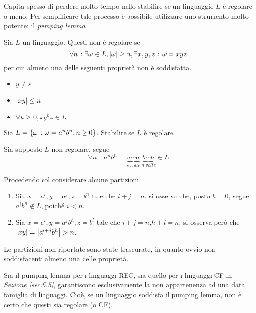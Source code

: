 \documentclass{subfiles}
\begin{document}
Capita spesso di perdere molto tempo nello stabilire se un linguaggio \(L\) è regolare o meno.
Per semplificare tale processo è possibile utilizzare uno strumento molto potente: il \emph{pumping lemma}.

\begin{Lemma}
    Sia \(L\) un linguaggio. Questi non è regolare se
    \[
        \forall n \operatorname{\: {:} \:} \exists \omega \in L, \abs{\omega} \ge n, \exists x,y,z \operatorname{\: {:} \:} \omega = xyz
    \]
    per cui almeno una delle seguenti proprietà non è soddisfatta.
    \begin{multicols}{3}
        \begin{itemize}
            \item \(y \neq \varepsilon\)
            \item \(\abs{xy} \le n\)
            \item \(\forall k \ge 0, xy^{k}z \in L\)
        \end{itemize}
    \end{multicols}
\end{Lemma}

\begin{Exercise*}
    Sia \(L = \left\{\omega \operatorname{\: {:} \:} \omega = a^{n}b^{n}, n \ge 0\right\}\). Stabilire se \(L\) è regolare.
    \begin{Solution*}
        Sia supposto \(L\) non regolare, segue
        \[
            \forall n \quad a^{n}b^{n} = \underbrace{a \cdots a}_{n \ volte} \underbrace{b \cdots b}_{\ n \ volte} \in L
        \]

        \noindent Procedendo col considerare alcune partizioni
        \begin{enumerate}
            \item Sia \(x = a^{i}, y = a^{j}, z = b^{n}\) tale che \(i + j = n\):
                  si osserva che, posto \(k = 0\), segue \(a^{i}b^{n} \notin L\), poiché \(i < n\).

            \item Sia \(x = a^{i}, y = a^{j}b^{h}, z = b^{l}\) tale che \(i + j = n \text{,} h + l = n\):
                  si osserva però che \(\abs{xy} = \abs{a^{i + j}b^{h}} > n\).
        \end{enumerate}

        \begin{Note*}
            Le partizioni non riportate sono state trascurate, in quanto ovvio non soddisfacenti almeno una delle proprietà.
        \end{Note*}
    \end{Solution*}
\end{Exercise*}
\begin{Remark*}
    Sia il pumping lemma per i linguaggi REC, sia quello per i linguaggi CF in \emph{Sezione \eqref{sec:6.5}}, garantiscono esclusivamente la non appartenenza ad una data famiglia di linguaggi.
    Cioè, se un linguaggio soddisfa il pumping lemma, non è certo che questi sia regolare (o CF).
\end{Remark*}
\clearpage
\end{document}
